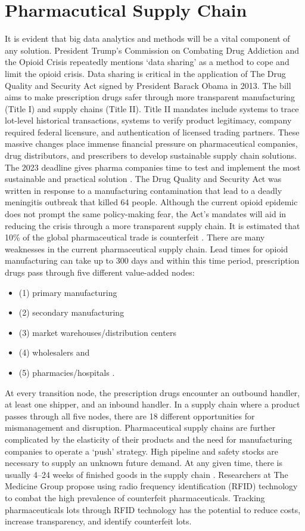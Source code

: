 \documentclass[sigconf]{acmart}
\begin{document}
\section{Pharmacutical Supply Chain}
It is evident that big data analytics and methods will be a vital component of any solution. President Trump’s Commission on Combating Drug Addiction and the Opioid Crisis repeatedly mentions ‘data sharing’ as a method to cope and limit the opioid crisis\cite{opsis3}. Data sharing is critical in the application of The Drug Quality and Security Act signed by President Barack Obama in 2013. The bill aims to make prescription drugs safer through more transparent manufacturing (Title I) and supply chains (Title II). Title II mandates include systems to trace lot-level historical transactions, systems to verify product legitimacy, company required federal licensure, and authentication of licensed trading partners. These massive changes place immense financial pressure on pharmaceutical companies, drug distributors, and prescribers to develop sustainable supply chain solutions. The 2023 deadline gives pharma companies time to test and implement the most sustainable and practical solution \cite{opsis8}. The Drug Quality and Security Act was written in response to a manufacturing contamination that lead to a deadly meningitis outbreak that killed 64 people. Although the current opioid epidemic does not prompt the same policy-making fear, the Act’s mandates will aid in reducing the crisis through a more transparent supply chain. It is estimated that 10\% of the global pharmaceutical trade is counterfeit \cite{Kelesidis01}. There are many weaknesses in the current pharmaceutical supply chain. Lead times for opioid manufacturing can take up to 300 days and within this time period, prescription drugs pass through five different value-added nodes:
\begin{itemize}
\item (1) primary manufacturing
\item (2) secondary manufacturing
\item (3) market warehouses/distribution centers
\item (4) wholesalers and
\item (5) pharmacies/hospitals \cite{Shah01}.
\end{itemize}

At every transition node, the prescription drugs encounter an outbound handler, at least one shipper, and an inbound handler. In a supply chain where a product passes through all five nodes, there are 18 different opportunities for mismanagement and disruption. Pharmaceutical supply chains are further complicated by the elasticity of their products and the need for manufacturing companies to operate a ‘push’ strategy. High pipeline and safety stocks are necessary to supply an unknown future demand. At any given time, there is usually 4–24 weeks of finished goods in the supply chain \cite{Shah01}. Researchers at The Medicine Group propose using radio frequency identification (RFID) technology to combat the high prevalence of counterfeit pharmaceuticals\cite{Taylor01}. Tracking pharmaceuticals lots through RFID technology has the potential to reduce costs, increase transparency, and identify counterfeit lots. 
\end{document}
